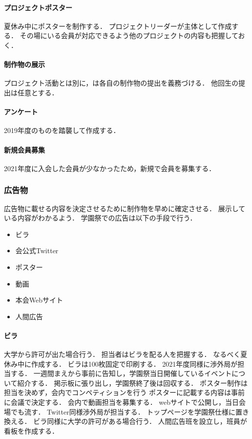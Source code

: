 \paragraph{プロジェクトポスター}
夏休み中にポスターを制作する．
プロジェクトリーダーが主体として作成する．
その場にいる会員が対応できるよう他のプロジェクトの内容も把握しておく．
\paragraph{制作物の展示}
プロジェクト活動とは別に\secondGrade{}，\thirdGrade{}は各自の制作物の提出を義務づける．
他回生の提出は任意とする．
\paragraph{アンケート}
2019年度のものを踏襲して作成する．
\paragraph{新規会員募集}
2021年度に入会した会員が少なかったため，新規で会員を募集する．
    
\subsubsection*{広告物}
広告物に載せる内容を決定させるために制作物を早めに確定させる．
展示している内容がわかるよう．
学園祭での広告は以下の手段で行う．
\begin{itemize}
    \item ビラ
    \item 会公式Twitter
    \item ポスター
    \item 動画
    \item 本会Webサイト
    \item 人間広告
\end{itemize}
\paragraph{ビラ}
大学から許可が出た場合行う．
担当者はビラを配る人を把握する．
なるべく夏休み中に作成する．
ビラは100枚固定で印刷する．
2021年度同様に渉外局が担当する．
一週間まえから事前に告知し，学園祭当日開催しているイベントについて紹介する．
掲示板に張り出し，学園祭終了後は回収する．
ポスター制作は担当を決めず，会内でコンペティションを行う
ポスターに記載する内容は事前に会議で決定する．
会内で動画担当を募集する．
webサイトで公開し，当日会場でも流す．
Twitter同様渉外局が担当する．
トップページを学園祭仕様に置き換える．
ビラ同様に大学の許可がある場合行う．
人間広告班を設立し，班員が看板を作成する．

